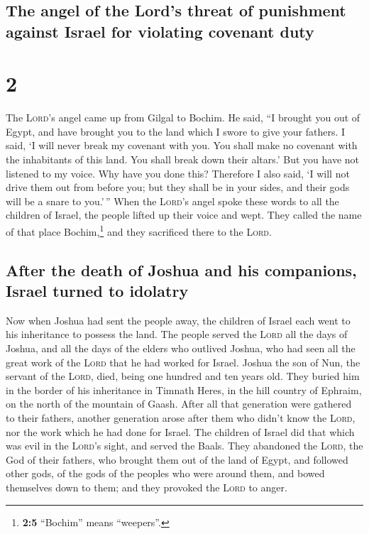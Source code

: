 \hypertarget{the-angel-of-the-lords-threat-of-punishment-against-israel-for-violating-covenant-duty}{%
\subsection{The angel of the Lord's threat of punishment against Israel
for violating covenant
duty}\label{the-angel-of-the-lords-threat-of-punishment-against-israel-for-violating-covenant-duty}}

\hypertarget{section-1}{%
\section{2}\label{section-1}}

 The \textsc{Lord}'s angel came up from Gilgal to Bochim.
He said, ``I brought you out of Egypt, and have brought you to the land
which I swore to give your fathers. I said, `I will never break my
covenant with you.  You shall make no covenant with the
inhabitants of this land. You shall break down their altars.' But you
have not listened to my voice. Why have you done this? 
Therefore I also said, `I will not drive them out from before you; but
they shall be in your sides, and their gods will be a snare to you.'\,''
 When the \textsc{Lord}'s angel spoke these words to all
the children of Israel, the people lifted up their voice and wept.
 They called the name of that place Bochim,\footnote{\textbf{2:5}
  ``Bochim'' means ``weepers''.} and they sacrificed there to the
\textsc{Lord}.

\hypertarget{after-the-death-of-joshua-and-his-companions-israel-turned-to-idolatry}{%
\subsection{After the death of Joshua and his companions, Israel turned
to
idolatry}\label{after-the-death-of-joshua-and-his-companions-israel-turned-to-idolatry}}

 Now when Joshua had sent the people away, the children of
Israel each went to his inheritance to possess the land. 
The people served the \textsc{Lord} all the days of Joshua, and all the
days of the elders who outlived Joshua, who had seen all the great work
of the \textsc{Lord} that he had worked for Israel. 
Joshua the son of Nun, the servant of the \textsc{Lord}, died, being one
hundred and ten years old.  They buried him in the border
of his inheritance in Timnath Heres, in the hill country of Ephraim, on
the north of the mountain of Gaash.  After all that
generation were gathered to their fathers, another generation arose
after them who didn't know the \textsc{Lord}, nor the work which he had
done for Israel.  The children of Israel did that which
was evil in the \textsc{Lord}'s sight, and served the Baals.
 They abandoned the \textsc{Lord}, the God of their
fathers, who brought them out of the land of Egypt, and followed other
gods, of the gods of the peoples who were around them, and bowed
themselves down to them; and they provoked the \textsc{Lord} to anger.

